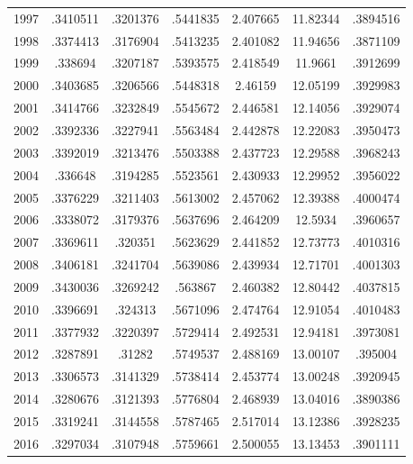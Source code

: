 {\begin{longtable}{l*{1}{cccccc}}
1997        &    .3410511&    .3201376&    .5441835&    2.407665&    11.82344&    .3894516\\
1998        &    .3374413&    .3176904&    .5413235&    2.401082&    11.94656&    .3871109\\
1999        &     .338694&    .3207187&    .5393575&    2.418549&     11.9661&    .3912699\\
2000        &    .3403685&    .3206566&    .5448318&     2.46159&    12.05199&    .3929983\\
2001        &    .3414766&    .3232849&    .5545672&    2.446581&    12.14056&    .3929074\\
2002        &    .3392336&    .3227941&    .5563484&    2.442878&    12.22083&    .3950473\\
2003        &    .3392019&    .3213476&    .5503388&    2.437723&    12.29588&    .3968243\\
2004        &     .336648&    .3194285&    .5523561&    2.430933&    12.29952&    .3956022\\
2005        &    .3376229&    .3211403&    .5613002&    2.457062&    12.39388&    .4000474\\
2006        &    .3338072&    .3179376&    .5637696&    2.464209&     12.5934&    .3960657\\
2007        &    .3369611&     .320351&    .5623629&    2.441852&    12.73773&    .4010316\\
2008        &    .3406181&    .3241704&    .5639086&    2.439934&    12.71701&    .4001303\\
2009        &    .3430036&    .3269242&     .563867&    2.460382&    12.80442&    .4037815\\
2010        &    .3396691&     .324313&    .5671096&    2.474764&    12.91054&    .4010483\\
2011        &    .3377932&    .3220397&    .5729414&    2.492531&    12.94181&    .3973081\\
2012        &    .3287891&      .31282&    .5749537&    2.488169&    13.00107&     .395004\\
2013        &    .3306573&    .3141329&    .5738414&    2.453774&    13.00248&    .3920945\\
2014        &    .3280676&    .3121393&    .5776804&    2.468939&    13.04016&    .3890386\\
2015        &    .3319241&    .3144558&    .5787465&    2.517014&    13.12386&    .3928235\\
2016        &    .3297034&    .3107948&    .5759661&    2.500055&    13.13453&    .3901111\\

\end{longtable}}
